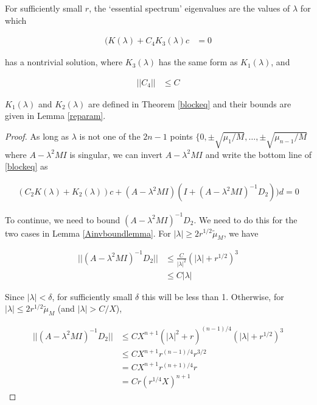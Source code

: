 \documentclass[thesis.tex]{subfiles}
\begin{document}
\begin{lemma}\label{ceqlemma}
For sufficiently small $r$, the `essential spectrum' eigenvalues are the values of $\lambda$ for which 

\begin{align}\label{eqforc}
(K(\lambda) + C_4 K_3(\lambda)c &= 0
\end{align}

has a nontrivial solution, where $K_3(\lambda)$ has the same form as $K_1(\lambda)$, and

\begin{align*}
||C_4|| &\leq C
\end{align*}

$K_1(\lambda)$ and $K_2(\lambda)$ are defined in Theorem \ref{blockeq} and their bounds are given in Lemma \ref{reparam}.

\begin{proof}
As long as $\lambda$ is not one of the $2n - 1$ points $\{0, \pm \sqrt{\mu_1/M}, \dots, \pm \sqrt{\mu_{n-1}/M}$ where $A - \lambda^2 MI$ is singular, we can invert $A - \lambda^2 MI$ and write the bottom line of \eqref{blockeq} as 

\begin{align}\label{blockeqbottom}
(C_2 K(\lambda) + K_2(\lambda))c 
+ (A - \lambda^2 MI)(I + (A - \lambda^2 MI)^{-1} D_2))d = 0
\end{align}

To continue, we need to bound $(A - \lambda^2 MI)^{-1} D_2$. We need to do this for the two cases in Lemma \ref{Ainvboundlemma}. For $|\lambda| \geq 2 r^{1/2} \tilde{\mu}_M$, we have

\begin{align*}
|| (A - \lambda^2 MI)^{-1} D_2 || &\leq \frac{C}{|\lambda|^2} (|\lambda| + r^{1/2})^3 \\ 
&\leq C |\lambda|
\end{align*}

Since $|\lambda| < \delta$, for sufficiently small $\delta$ this will be less than 1. Otherwise, for $|\lambda| \leq 2 r^{1/2} \tilde{\mu}_M$ (and $|\lambda| > C/X$),

\begin{align*}
|| (A - \lambda^2 MI)^{-1} D_2 || &\leq C X^{n+1}\left( |\lambda|^2 + r \right)^{(n-1)/4} (|\lambda| + r^{1/2})^3 \\
&\leq C X^{n+1} r^{(n-1)/4} r^{3/2} \\ 
&= C X^{n+1} r^{(n+1)/4} r \\
&= C r (r^{1/4} X)^{n+1}
\end{align*}


\end{proof}
\end{lemma}
\end{document}
